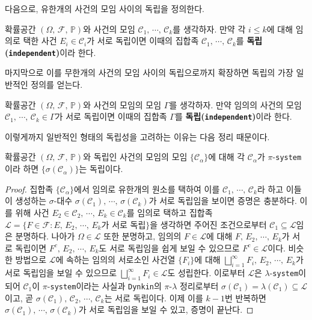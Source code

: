 다음으로, 유한개의 사건의 모임 사이의 독립을 정의한다.

\begin{definition}
    확률공간 $(\Omega,\,\mathcal{F},\,\mathbb{P})$와 사건의 모임 $\mathcal{C}_1,\,\cdots,\,\mathcal{C}_k$를 생각하자. 만약 각 $i\leq k$에 대해 임의로 택한 사건 $E_i\in\mathcal{C}_i$가 서로 독립이면 이때의 집합족 $\mathcal{C}_1,\,\cdots,\,\mathcal{C}_k$를 \textbf{독립(\texttt{independent})}이라 한다.
\end{definition}

마지막으로 이를 무한개의 사건의 모임 사이의 독립으로까지 확장하면 독립의 가장 일반적인 정의를 얻는다.

\begin{definition}
    확률공간 $(\Omega,\,\mathcal{F},\,\mathbb{P})$와 사건의 모임의 모임 $\Gamma$를 생각하자. 만약 임의의 사건의 모임 $\mathcal{C}_1,\,\cdots,\,\mathcal{C}_k\in\Gamma$가 서로 독립이면 이때의 집합족 $\Gamma$를 \textbf{독립(\texttt{independent})}이라 한다.
\end{definition}

이렇게까지 일반적인 형태의 독립성을 고려하는 이유는 다음 정리 때문이다.

\begin{theorem}
    확률공간 $(\Omega,\,\mathcal{F},\,\mathbb{P})$와 독립인 사건의 모임의 모임 $\{\mathcal{C}_\alpha\}$에 대해 각 $\mathcal{C}_\alpha$가 $\pi$-\texttt{system}이라 하면 $\{\sigma(\mathcal{C}_\alpha)\}$는 독립이다.
\end{theorem}

\begin{proof}
    집합족 $\{\mathcal{C}_\alpha\}$에서 임의로 유한개의 원소를 택하여 이를 $\mathcal{C}_1,\,\cdots,\,\mathcal{C}_k$라 하고 이들이 생성하는 $\sigma$-대수 $\sigma(\mathcal{C}_1),\,\cdots,\,\sigma(\mathcal{C}_k)$가 서로 독립임을 보이면 증명은 충분하다. 이를 위해 사건 $E_2\in\mathcal{C}_2,\,\cdots,\,E_k\in\mathcal{C}_k$를 임의로 택하고 집합족 $\mathcal{L}=\{F\in\mathcal{F}:E,\,E_2,\,\cdots,\,E_k\textrm{가 서로 독립}\}$을 생각하면 주어진 조건으로부터 $\mathcal{C}_1\subseteq\mathcal{L}$임은 분명하다. 나아가 $\Omega\in\mathcal{L}$ 또한 분명하고, 임의의 $F\in\mathcal{L}$에 대해 $F,\,E_2,\,\cdots,\,E_k$가 서로 독립이면 $F^c,\,E_2,\,\cdots,\,E_k$도 서로 독립임을 쉽게 보일 수 있으므로 $F^c\in\mathcal{L}$이다. 비슷한 방법으로 $\mathcal{L}$에 속하는 임의의 서로소인 사건열 $\{F_i\}$에 대해 $\bigsqcup_{i=1}^\infty F_i,\,E_2,\,\cdots,\,E_k$가 서로 독립임을 보일 수 있으므로 $\bigsqcup_{i=1}^\infty F_i\in\mathcal{L}$도 성립한다. 이로부터 $\mathcal{L}$은 $\lambda$-\texttt{system}이 되어 $\mathcal{C}_1$이 $\pi$-\texttt{system}이라는 사실과 \texttt{Dynkin}의 $\pi$-$\lambda$ 정리로부터 $\sigma(\mathcal{C}_1)=\lambda(\mathcal{C}_1)\subseteq\mathcal{L}$이고, 곧 $\sigma(\mathcal{C}_1),\,\mathcal{C}_2,\,\cdots,\,\mathcal{C}_k$는 서로 독립이다. 이제 이를 $k-1$번 반복하면 $\sigma(\mathcal{C}_1),\,\cdots,\,\sigma(\mathcal{C}_k)$가 서로 독립임을 보일 수 있고, 증명이 끝난다.
\end{proof}


